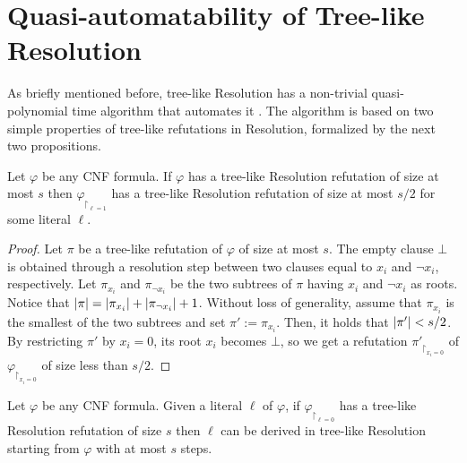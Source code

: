 \section{Quasi-automatability of Tree-like Resolution}
\label{sec:auto_treelike}

As briefly mentioned before, tree-like Resolution has a non-trivial quasi-polynomial time algorithm that automates it \cite{pitassi}. The algorithm is based on two simple properties of tree-like refutations in Resolution, formalized by the next two propositions.

\begin{proposition}
    \label{prop:s/2_ref}
    Let $\varphi$ be any CNF formula. If $\varphi$ has a tree-like Resolution refutation of size at most $s$ then $\varphi_{\upharpoonright_{\ell = 1}}$ has a tree-like Resolution refutation of size at most $s/2$ for some literal $\ell$.
\end{proposition}

\begin{proof}
    Let $\pi$ be a tree-like refutation of $\varphi$ of size at most $s$. The empty clause $\bot$ is obtained through a resolution step between two clauses equal to $x_i$ and $\lnot x_i$, respectively. Let $\pi_{x_i}$ and $\pi_{\lnot x_i}$ be the two subtrees of $\pi$ having $x_i$ and $\lnot x_i$ as roots. Notice that $\left|\pi\right| = \left|\pi_{x_i}\right| + \left|\pi_{\lnot x_i}\right| + 1$. Without loss of generality, assume that $\pi_{x_i}$ is the smallest of the two subtrees and set $\pi' := \pi_{x_i}$. Then, it holds that $\left|\pi'\right| < s/2$. By restricting $\pi'$ by $x_i = 0$, its root $x_i$ becomes $\bot$, so we get a refutation $\pi'_{\upharpoonright_{x_i = 0}}$ of $\varphi_{\upharpoonright_{x_i = 0}}$ of size less than $s/2$.
\end{proof}

\begin{proposition}
    \label{prop:lit_ref}
    Let $\varphi$ be any CNF formula. Given a literal $\ell$ of $\varphi$, if $\varphi_{\upharpoonright_{\ell = 0}}$ has a tree-like Resolution refutation of size $s$ then $\ell$ can be derived in tree-like Resolution starting from $\varphi$ with at most $s$ steps.
\end{proposition}

